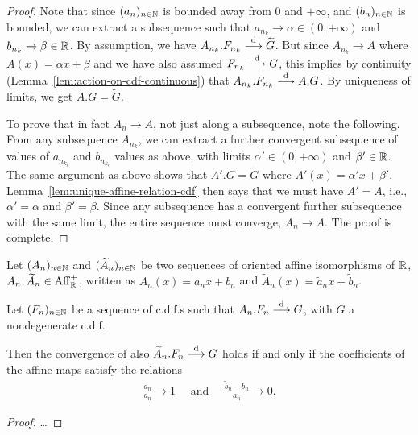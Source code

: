 \begin{proof}
  Note that since $(a_n)_{n \in \mathbb{N}}$ is bounded away from $0$ and $+\infty$,
  and $(b_n)_{n \in \mathbb{N}}$ is bounded, we can extract a subsequence such that
  $a_{n_k} \to \alpha \in (0,+\infty)$ and $b_{n_k} \to \beta \in \mathbb{R}$.
  By assumption, we have $A_{n_k} . F_{n_k} \overset{\mathrm{d}}{\longrightarrow} \widetilde{G}$.
  But since $A_{n_k} \to A$ where $A(x) = \alpha x + \beta$
  and we have also assumed $F_{n_k} \overset{\mathrm{d}}{\longrightarrow} G$, this implies by
  continuity (Lemma~\ref{lem:action-on-cdf-continuous}) that $A_{n_k} . F_{n_k} \overset{\mathrm{d}}{\longrightarrow} A . G$.
  By uniqueness of limits, we get $A . G = \widetilde{G}$.

  To prove that in fact $A_n \to A$, not just along a subsequence, note the
  following. From any subsequence $A_{n_k}$, we can extract a further
  convergent subsequence of values of $a_{n_{k_\ell}}$ and $b_{n_{k_\ell}}$
  values as above, with limits $\alpha' \in (0,+\infty)$
  and $\beta' \in \mathbb{R}$. The same argument as above shows that
  $A' . G = \widetilde{G}$ where $A'(x) = \alpha' x + \beta'$.
  Lemma~\ref{lem:unique-affine-relation-cdf} then says that we must have
  $A' = A$, i.e., $\alpha' = \alpha$ and $\beta' = \beta$. Since any
  subsequence has a convergent further subsequence with the same limit,
  the entire sequence must converge, $A_n \to A$.
  The proof is complete.
\end{proof}

\begin{theorem}
  \label{thm:convergence-to-types-different-affine}
  Let $(A_n)_{n \in \mathbb{N}}$ and
  $(\widetilde{A}_n)_{n \in \mathbb{N}}$ be two sequences of oriented
  affine isomorphisms of $\mathbb{R}$, $A_n, \widetilde{A}_n \in \mathrm{Aff}^+_{\mathbb{R}}$,
  written as $A_n(x) = a_n x + b_n$
  and $\widetilde{A}_n(x) = \tilde{a}_n x + \tilde{b}_n$.

  Let $(F_n)_{n \in \mathbb{N}}$ be a sequence of c.d.f.s
  such that $A_n.F_n \overset{\mathrm{d}}{\longrightarrow} G$, with
  $G$ a nondegenerate c.d.f.

  Then the convergence of also $\widetilde{A}_n.F_n \overset{\mathrm{d}}{\longrightarrow} G$
  holds if and only if the coefficients of the affine maps
  satisfy the relations
  \begin{align*}
    \frac{\tilde{a}_n}{a_n} \to 1
    \quad \text{ and } \quad
    \frac{\tilde{b}_n - b_n}{a_n} \to 0 .
  \end{align*}
\end{theorem}
\begin{proof}
  \ldots
\end{proof}

